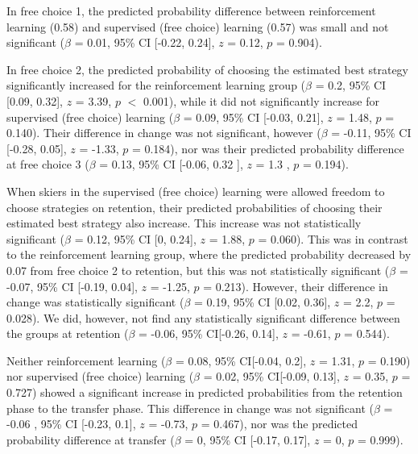 \documentclass[pdflatex,sn-mathphys-num]{sn-jnl}%
\theoremstyle{thmstyleone}%
\theoremstyle{thmstyletwo}%
\theoremstyle{thmstylethree}%
\begin{document}
In free choice 1, the predicted probability difference between reinforcement learning (0.58) and supervised (free choice) learning (0.57) was small and not significant ($\beta$ = 0.01, 95\% CI [-0.22, 0.24], $z$ = 0.12, $p$ = 0.904). 

In free choice 2, the predicted probability of choosing the estimated best strategy significantly increased for the reinforcement learning group ($\beta$ = 0.2, 95\% CI [0.09, 0.32], $z$ = 3.39, $p$  $<$ 0.001), while it did not significantly increase for supervised (free choice) learning ($\beta$ = 0.09, 95\% CI [-0.03, 0.21], $z$ = 1.48, $p$ = 0.140). Their difference in change was not significant, however ($\beta$ = -0.11, 95\% CI [-0.28, 0.05], $z$ = -1.33, $p$ = 0.184), nor was their predicted probability difference at free choice 3 ($\beta$ = 0.13, 95\% CI [-0.06, 0.32 ], $z$ = 1.3 , $p$  =  0.194).

When skiers in the supervised (free choice) learning were allowed freedom to choose strategies on retention, their predicted probabilities of choosing their estimated best strategy also increase. This increase was not statistically significant ($\beta$ = 0.12, 95\% CI [0, 0.24], $z$ = 1.88, $p$ = 0.060). This was in contrast to the reinforcement learning group, where the predicted probability decreased by 0.07 from free choice 2 to retention, but this was not statistically significant ($\beta$ = -0.07, 95\% CI [-0.19, 0.04], $z$ = -1.25, $p$ = 0.213). However, their difference in change was statistically significant ($\beta$ = 0.19, 95\% CI [0.02, 0.36], $z$ = 2.2, $p$ = 0.028). We did, however,  not find any statistically significant difference between the groups at retention ($\beta$ = -0.06, 95\% CI[-0.26, 0.14], $z$ = -0.61, $p$ = 0.544).

Neither reinforcement learning ($\beta$ = 0.08, 95\% CI[-0.04, 0.2], $z$ = 1.31, $p$ = 0.190) nor supervised (free choice) learning ($\beta$ = 0.02, 95\% CI[-0.09, 0.13], $z$ = 0.35, $p$ = 0.727) showed a significant increase in predicted probabilities from the retention phase to the transfer phase. This difference in change was not significant ($\beta$ = -0.06 , 95\% CI [-0.23, 0.1], $z$ = -0.73, $p$ = 0.467), nor was the predicted probability difference at transfer ($\beta$ = 0, 95\% CI [-0.17, 0.17], $z$ = 0, $p$ = 0.999).
\end{document}
